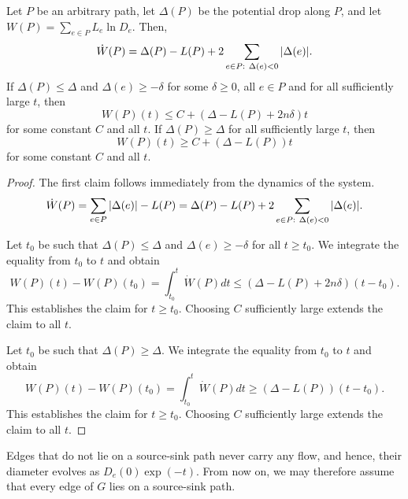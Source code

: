 \documentclass[11pt,a4paper]{article}
\newcommand{\Gorient}{\overrightarrow{G}}
\newcommand{\Eorient}{\overrightarrow{E}} \newcommand{\CB}{\mathit{F}}
\begin{document}
\begin{lemma}\label{lem: decay along undirected path} 
Let $P$ be an arbitrary path, let $\Delta(P)$ be the potential drop along $P$,
and let
$W(P) = \sum_{e \in P} L_e \ln D_e$. Then, 
\[   \dot{W}(P) = \Delta(P) - L(P) +  2
\sum_{e \in P:\ \Delta(e) < 0} | \Delta(e) | .\]
If $\Delta(P) \le \Delta$ and $\Delta(e) \ge -\delta$ for some $\delta \ge 0$, all $e \in P$ and for all sufficiently large $t$, then 
\[   W(P)(t) \le C + (\Delta - L(P) + 2 n \delta) t  \]
for some constant $C$ and all $t$. 
If $\Delta(P) \ge \Delta$ for all sufficiently large $t$, then 
\[   W(P)(t) \ge C + (\Delta - L(P)) t  \]
for some constant $C$ and all $t$. 
\end{lemma}
\begin{proof} The first claim follows immediately from the dynamics of the
system. 
\[   \dot{W}(P) = \sum_{e \in P} | \Delta(e) | - L(P) = \Delta(P) - L(P) +  2
\sum_{e \in P:\ \Delta(e) < 0} | \Delta(e) |.\]

Let $t_0$ be such that $\Delta(P) \le \Delta$ and $\Delta(e) \ge -\delta$ for all $t
\ge t_0$. We integrate the equality from $t_0$ to $t$ and obtain
\[  W(P)(t) - W(P)(t_0) = \int_{t_0}^t  \dot{W}(P) dt \le (\Delta - L(P) +
2n \delta)(t - t_0).\]
This establishes the claim for $t \ge t_0$. Choosing $C$ sufficiently large
extends the claim to all $t$. 

Let $t_0$ be such that $\Delta(P) \ge \Delta$. We integrate the equality from $t_0$ to $t$ and obtain
\[  W(P)(t) - W(P)(t_0) = \int_{t_0}^t  \dot{W}(P) dt \ge (\Delta - L(P))(t - t_0).\]
This establishes the claim for $t \ge t_0$. Choosing $C$ sufficiently large
extends the claim to all $t$. 
\end{proof}













Edges that do not lie on a source-sink path never carry any flow, and
hence, their diameter evolves as $D_e(0) \exp(-t)$. From now on, we may
therefore assume that every edge of $G$ lies on a source-sink path. 
\end{document}
